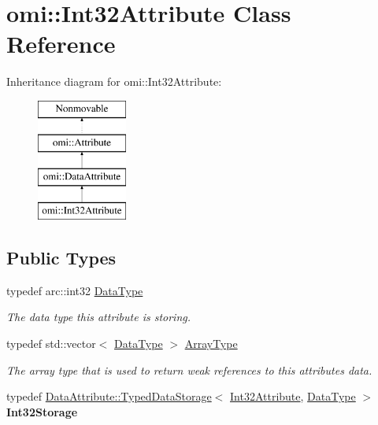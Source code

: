 \hypertarget{classomi_1_1_int32_attribute}{}\section{omi\+:\+:Int32\+Attribute Class Reference}
\label{classomi_1_1_int32_attribute}
Inheritance diagram for omi\+:\+:Int32\+Attribute\+:\begin{figure}[H]
\begin{center}
\leavevmode
\includegraphics[height=4.000000cm]{classomi_1_1_int32_attribute}
\end{center}
\end{figure}
\subsection*{Public Types}
\begin{DoxyCompactItemize}
\item 
typedef arc\+::int32 \hyperlink{classomi_1_1_int32_attribute_aaafef3adcf9a0111695451449dfa1a2d}{Data\+Type}\hypertarget{classomi_1_1_int32_attribute_aaafef3adcf9a0111695451449dfa1a2d}{}\label{classomi_1_1_int32_attribute_aaafef3adcf9a0111695451449dfa1a2d}

\begin{DoxyCompactList}\small\item\em The data type this attribute is storing. \end{DoxyCompactList}\item 
typedef std\+::vector$<$ \hyperlink{classomi_1_1_int32_attribute_aaafef3adcf9a0111695451449dfa1a2d}{Data\+Type} $>$ \hyperlink{classomi_1_1_int32_attribute_a09ae7167f71512dc47ef34d96bf3baf5}{Array\+Type}\hypertarget{classomi_1_1_int32_attribute_a09ae7167f71512dc47ef34d96bf3baf5}{}\label{classomi_1_1_int32_attribute_a09ae7167f71512dc47ef34d96bf3baf5}

\begin{DoxyCompactList}\small\item\em The array type that is used to return weak references to this attribute\textquotesingle{}s data. \end{DoxyCompactList}\item 
typedef \hyperlink{classomi_1_1_data_attribute_1_1_typed_data_storage}{Data\+Attribute\+::\+Typed\+Data\+Storage}$<$ \hyperlink{classomi_1_1_int32_attribute}{Int32\+Attribute}, \hyperlink{classomi_1_1_int32_attribute_aaafef3adcf9a0111695451449dfa1a2d}{Data\+Type} $>$ {\bfseries Int32\+Storage}\hypertarget{classomi_1_1_int32_attribute_ae3fe389bff1926ad7327338433ac05d9}{}\label{classomi_1_1_int32_attribute_ae3fe389bff1926ad7327338433ac05d9}

\end{DoxyCompactItemize}
